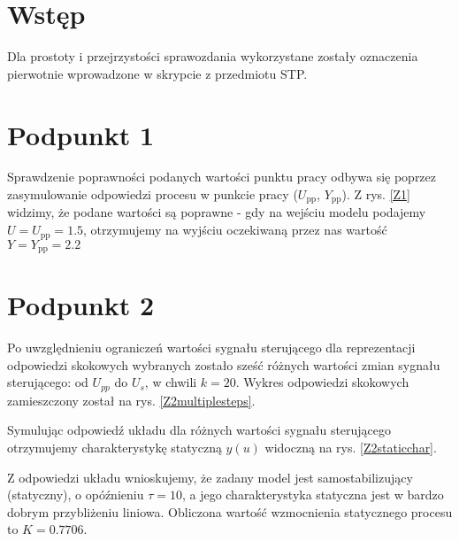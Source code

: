 \chapter{Wstęp}
Dla prostoty i przejrzystości sprawozdania wykorzystane zostały oznaczenia pierwotnie wprowadzone w skrypcie z przedmiotu STP.

\chapter{Podpunkt 1}
Sprawdzenie poprawności podanych wartości punktu pracy odbywa się poprzez zasymulowanie odpowiedzi procesu w punkcie pracy ($U_{\mathrm{pp}}$, $Y_{\mathrm{pp}}$). Z rys. \ref{Z1} widzimy, że podane wartości są poprawne - gdy na wejściu modelu podajemy $U=U_{\mathrm{pp}}=\num{1,5}$, otrzymujemy na wyjściu oczekiwaną przez nas wartość $Y=Y_{\mathrm{pp}}=\num{2,2}$




\chapter{Podpunkt 2}
Po uwzględnieniu ograniczeń wartości sygnału sterującego dla reprezentacji odpowiedzi skokowych wybranych zostało sześć różnych wartości zmian sygnału sterującego: od $U_{pp}$ do $U_s$, w chwili $k=20$. Wykres odpowiedzi skokowych zamieszczony został na rys. \ref{Z2multiplesteps}.



Symulując odpowiedź układu dla różnych wartości sygnału sterującego otrzymujemy charakterystykę statyczną $y(u)$ widoczną na rys. \ref{Z2staticchar}.

















Z odpowiedzi układu wnioskujemy, że zadany model jest samostabilizujący (statyczny), o opóźnieniu $\tau =10$, a jego charakterystyka statyczna jest w bardzo dobrym przybliżeniu liniowa. Obliczona wartość wzmocnienia statycznego procesu to $K=\num{0,7706}$.


